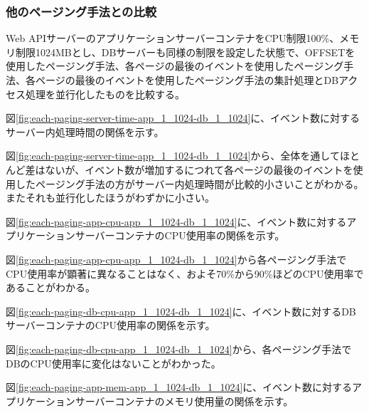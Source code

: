 \documentclass[../../../../main]{subfiles}
\begin{document}
    \subsubsection{他のページング手法との比較}\label{subsubsec:result-each-paging-only-limit}

    Web APIサーバーのアプリケーションサーバーコンテナをCPU制限100\%、メモリ制限1024MBとし、DBサーバーも同様の制限を設定した状態で、OFFSETを使用したページング手法、各ページの最後のイベントを使用したページング手法、各ページの最後のイベントを使用したページング手法の集計処理とDBアクセス処理を並行化したものを比較する。

    \label{subsubsubsec:result-each-paging-only-limit-server-time}

    図\ref{fig:each-paging-server-time-app_1_1024-db_1_1024}に、イベント数に対するサーバー内処理時間の関係を示す。

    

    図\ref{fig:each-paging-server-time-app_1_1024-db_1_1024}から、全体を通してほとんど差はないが、イベント数が増加するにつれて各ページの最後のイベントを使用したページング手法の方がサーバー内処理時間が比較的小さいことがわかる。またそれも並行化したほうがわずかに小さい。

    \label{subsubsubsec:result-each-paging-only-limit-cpu}

    図\ref{fig:each-paging-app-cpu-app_1_1024-db_1_1024}に、イベント数に対するアプリケーションサーバーコンテナのCPU使用率の関係を示す。

    

    図\ref{fig:each-paging-app-cpu-app_1_1024-db_1_1024}から各ページング手法でCPU使用率が顕著に異なることはなく、およそ70\%から90\%ほどのCPU使用率であることがわかる。

    図\ref{fig:each-paging-db-cpu-app_1_1024-db_1_1024}に、イベント数に対するDBサーバーコンテナのCPU使用率の関係を示す。

    

    図\ref{fig:each-paging-db-cpu-app_1_1024-db_1_1024}から、各ページング手法でDBのCPU使用率に変化はないことがわかった。

    \label{subsubsubsec:result-each-paging-only-limit-mem}

    図\ref{fig:each-paging-app-mem-app_1_1024-db_1_1024}に、イベント数に対するアプリケーションサーバーコンテナのメモリ使用量の関係を示す。
\end{document}
